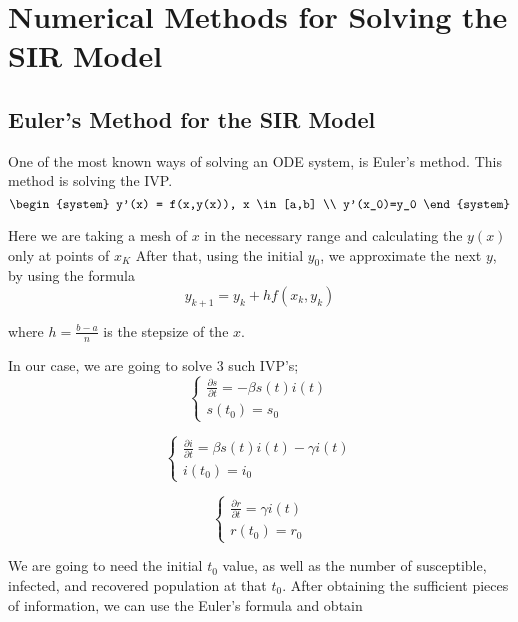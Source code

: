 \section{Numerical Methods for Solving the SIR Model}\label{Numerical_Methods}\thispagestyle{SectionFirstPage} %
\subsection{Euler's Method for the SIR Model}\label{multicollinearity}

\hspace{\parindent} One of the most known ways of solving an ODE system, is Euler's method. This method is solving the IVP.
\begin{equation}
	\begin{system}
		y'(x) = f(x,y(x)), x \in [a,b]
		\\
		y'(x_0)=y_0 
	\end{system}
\end{equation}

\par Here we are taking a mesh of $x$ in the necessary range and calculating the $y(x)$ only at points of $x_K$
After that, using the initial $y_0$, we approximate the next $y$, by using the formula
\begin{equation}
	y_{k+1} = y_k + h f(x_k,y_k)
\end{equation}
\par where $h=\frac{b-a}{n}$ is the stepsize of the $x$.
\par In our case, we are going to solve 3 such IVP's;
\[
	\left\{
		\begin{array}{l}
			\frac{\partial s}{\partial t} = -\beta s(t)  i(t)  \\
			s(t_0)=s_0
		\end{array}
	\right.
\]

\[
	\left\{
		\begin{array}{l}
			\frac{\partial i}{\partial t} = \beta s(t)  i(t) - \gamma i(t) \\
			i(t_0)=i_0
		\end{array}
	\right.
\]

\[
	\left\{
		\begin{array}{l}
			\frac{\partial r}{\partial t} = \gamma i(t) \\
			r(t_0)=r_0
		\end{array}
	\right.
\]

\par We are going to need the initial $t_0$ value, as well as the number
of susceptible, infected, and recovered population at that $t_0$.
After obtaining the sufficient pieces of information, we can use the Euler's formula and obtain

